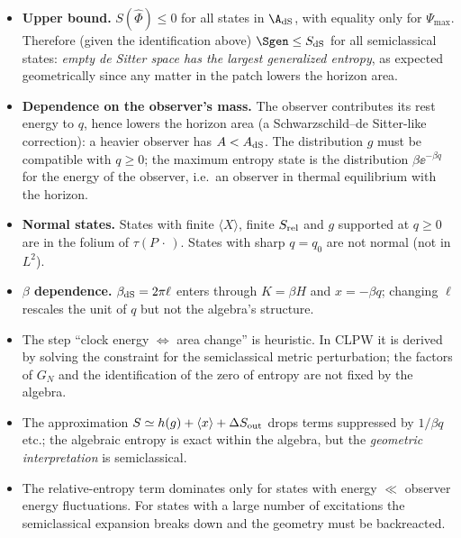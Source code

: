\begin{itemize}
\item \textbf{Upper bound.} $S(\hat\Phi)\le0$ for all states in $\A_{\rm dS}$, with equality only for $\Psi_{\max}$. Therefore (given the identification above) $\Sgen\le S_{\rm dS}$ for all semiclassical states: \emph{empty de Sitter space has the largest generalized entropy}, as expected geometrically since any matter in the patch lowers the horizon area.
\item \textbf{Dependence on the observer's mass.} The observer contributes its rest energy to $q$, hence lowers the horizon area (a Schwarzschild--de Sitter-like correction): a heavier observer has $A<A_{\rm dS}$. The distribution $g$ must be compatible with $q\ge0$; the maximum entropy state is the distribution $\beta\ee^{-\beta q}$ for the energy of the observer, i.e.\ an observer in thermal equilibrium with the horizon.
\item \textbf{Normal states.} States with finite $\langle X\rangle$, finite $S_{\rm rel}$ and $g$ supported at $q\ge0$ are in the folium of $\tau(P\,\cdot\,)$. States with sharp $q=q_0$ are not normal (not in $L^2$).
\item \textbf{$\beta$ dependence.} $\beta_{\rm dS}=2\pi\ell$ enters through $K=\beta H$ and $x=-\beta q$; changing $\ell$ rescales the unit of $q$ but not the algebra's structure.
\end{itemize}

\begin{whatwrong}
\begin{itemize}
\item The step ``clock energy $\Leftrightarrow$ area change'' is heuristic. In CLPW it is derived by solving the constraint for the semiclassical metric perturbation; the factors of $G_N$ and the identification of the zero of entropy are not fixed by the algebra.
\item The approximation $S\simeq h(g)+\langle x\rangle+\Delta S_{\rm out}$ drops terms suppressed by $1/\beta q$ etc.; the algebraic entropy is exact within the algebra, but the \emph{geometric interpretation} is semiclassical.
\item The relative-entropy term dominates only for states with energy $\ll$ observer energy fluctuations. For states with a large number of excitations the semiclassical expansion breaks down and the geometry must be backreacted.
\end{itemize}
\end{whatwrong}

